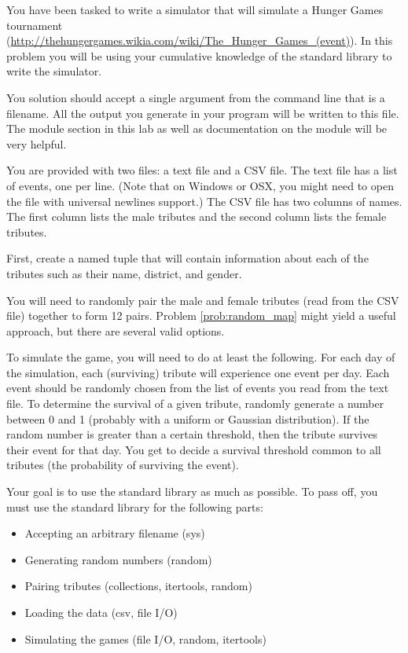 \begin{problem}
You have been tasked to write a simulator that will simulate a Hunger Games tournament (\url{http://thehungergames.wikia.com/wiki/The_Hunger_Games_(event)}).
In this problem you will be using your cumulative knowledge of the standard library to write the simulator.

You solution should accept a single argument from the command line that is a filename.  All the output you generate in your program will be written to this file. The  module section in this lab as well as documentation on the  module will be  very helpful.

You are provided with two files: a text file and a CSV file.
The text file has a list of events, one per line.
(Note that on Windows or OSX, you might need to open the file with universal newlines support.)
The CSV file has two columns of names.
The first column lists the male tributes and the second column lists the female tributes.

First, create a named tuple that will contain information about each of the tributes such as their name, district, and gender.

You will need to randomly pair the male and female tributes (read from the CSV file) together to form 12 pairs.
Problem \ref{prob:random_map} might yield a useful approach, but there are several valid options.

To simulate the game, you will need to do at least the following.
For each day of the simulation, each (surviving) tribute will experience one event per day. Each event should be randomly chosen from the list of events you read from the text file.
To determine the survival of a given tribute, randomly generate a number between 0 and 1 (probably with a uniform or Gaussian distribution).
If the random number is greater than a certain threshold, then the tribute survives their event for that day.
You get to decide a survival threshold common to all tributes (the probability of surviving the event).

Your goal is to use the standard library as much as possible.
To pass off, you must use the standard library for the following parts:
\begin{itemize}
\item Accepting an arbitrary filename (sys)
\item Generating random numbers (random)
\item Pairing tributes (collections, itertools, random)
\item Loading the data (csv, file I/O)
\item Simulating the games (file I/O, random, itertools)
\end{itemize}


\end{problem}
